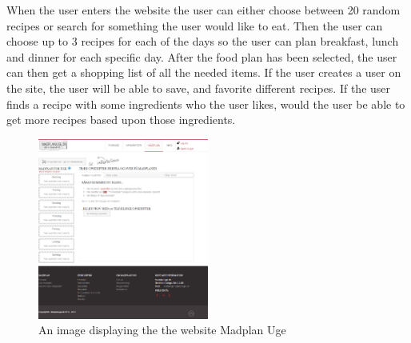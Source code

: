 When the user enters the website the user can either choose between 20 random recipes or search for something the user would like to eat.
Then the user can choose up to 3 recipes for each of the days so the user can plan breakfast, lunch and dinner for each specific day.
After the food plan has been selected, the user can then get a shopping list of all the needed items.
If the user creates a user on the site, the user will be able to save, and favorite different recipes.
If the user finds a recipe with some ingredients who the user likes, would the user be able to get more recipes based upon those ingredients.

\begin{figure}[H]
    \centering
    \includegraphics[width=0.5\textwidth]{Grafik/madplanuge}
    \caption{An image displaying the the website Madplan Uge}
    \label{MadPlanUge}
\end{figure}